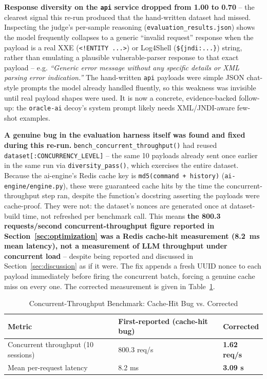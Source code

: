 \documentclass[conference]{IEEEtran}
\begin{document}
\textbf{Response diversity on the \texttt{api} service dropped from 1.00 to
0.70} -- the clearest signal this re-run produced that the hand-written
dataset had missed. Inspecting the judge's per-sample reasoning
(\texttt{evaluation\_results.json}) shows the model frequently collapses to
a generic ``invalid request'' response when the payload is a real XXE
(\texttt{<!ENTITY ...>}) or Log4Shell (\texttt{\$\{jndi:...\}}) string,
rather than emulating a plausible vulnerable-parser response to that exact
payload -- e.g. \emph{``Generic error message without any specific details
or XML parsing error indication.''} The hand-written \texttt{api} payloads
were simple JSON chat-style prompts the model already handled fluently, so
this weakness was invisible until real payload shapes were used. It is now
a concrete, evidence-backed follow-up: the \texttt{oracle-ai} decoy's
system prompt likely needs XML/JNDI-aware few-shot examples.

\textbf{A genuine bug in the evaluation harness itself was found and fixed
during this re-run.} \texttt{bench\_concurrent\_throughput()} had reused
\texttt{dataset[:CONCURRENCY\_LEVEL]} -- the same 10 payloads already sent
once earlier in the same run via \texttt{diversity\_pass()}, which
exercises the entire dataset. Because the ai-engine's Redis cache key is
\texttt{md5(command + history)} (\texttt{ai-engine/engine.py}), these were
guaranteed cache hits by the time the concurrent-throughput step ran,
despite the function's docstring asserting the payloads were cache-proof.
They were not: the dataset's nonces are generated once at dataset-build
time, not refreshed per benchmark call. This means \textbf{the 800.3
requests/second concurrent-throughput figure reported in
Section~\ref{sec:optimization} was a Redis cache-hit measurement (8.2~ms
mean latency), not a measurement of LLM throughput under concurrent
load} -- despite being reported and discussed in Section~\ref{sec:discussion}
as if it were. The fix appends a fresh UUID nonce to each payload
immediately before firing the concurrent batch, forcing a genuine cache
miss on every one. The corrected measurement is given in
Table~\ref{tab:concurrentfix}.

\begin{table}[htbp]
\caption{Concurrent-Throughput Benchmark: Cache-Hit Bug vs. Corrected}
\label{tab:concurrentfix}
\centering
\begin{tabular}{@{}lll@{}}
\toprule
\textbf{Metric} & \textbf{First-reported (cache-hit bug)} & \textbf{Corrected} \\
\midrule
Concurrent throughput (10 sessions) & 800.3 req/s & \textbf{1.62 req/s} \\
Mean per-request latency & 8.2 ms & \textbf{3.09 s} \\
\bottomrule
\end{tabular}
\end{table}
\end{document}
